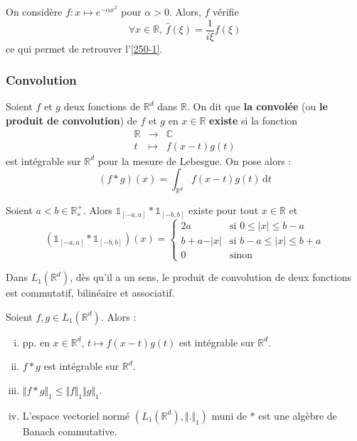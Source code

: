 	
	\begin{application}
		On considère $f : x \mapsto e^{- \alpha x^2}$ pour $\alpha > 0$. Alors, $f$ vérifie
		\[ \forall x \in \mathbb{R}, \, \widehat{f}(\xi) = \frac{1}{i \xi} f(\xi) \]
		ce qui permet de retrouver l'\cref{250-1}.
	\end{application}
	
	\subsubsection{Convolution}
	
	
	\begin{definition}
		Soient $f$ et $g$ deux fonctions de $\mathbb{R}^d$ dans $\mathbb{R}$. On dit que \textbf{la convolée} (ou \textbf{le produit de convolution}) de $f$ et $g$ en $x \in \mathbb{R}$ \textbf{existe} si la fonction
		\[
		\begin{array}{ccc}
			\mathbb{R} &\rightarrow& \mathbb{C} \\
			t &\mapsto& f(x-t)g(t)
		\end{array}
		\]
		est intégrable sur $\mathbb{R}^d$ pour la mesure de Lebesgue. On pose alors :
		\[ (f * g)(x) = \int_{\mathbb{R}^d} f(x-t)g(t) \, \mathrm{d}t \]
	\end{definition}
	
	\begin{example}
		Soient $a < b \in \mathbb{R}^+_*$. Alors $\mathbb{1}_{[-a, a]} * \mathbb{1}_{[-b,b]}$ existe pour tout $x \in \mathbb{R}$ et
		\[ \left( \mathbb{1}_{[-a, a]} * \mathbb{1}_{[-b,b]} \right)(x) =
		\begin{cases}
			2a &\text{si } 0 \leq \vert x \vert \leq b-a \\
			b+a-\vert x \vert &\text{si } b-a \leq \vert x \vert \leq b+a \\
			0 &\text{sinon}
		\end{cases}
		\]
	\end{example}
	
	\begin{proposition}
		Dans $L_1(\mathbb{R}^d)$, dès qu'il a un sens, le produit de convolution de deux fonctions est commutatif, bilinéaire et associatif.
	\end{proposition}
	
	\begin{theorem}
		Soient $f, g \in L_1(\mathbb{R}^d)$. Alors :
		\begin{enumerate}[(i)]
			\item pp. en $x \in \mathbb{R}^d$, $t \mapsto f(x-t)g(t)$ est intégrable sur $\mathbb{R}^d$.
			\item $f * g$ est intégrable sur $\mathbb{R}^d$.
			\item $\Vert f * g \Vert_1 \leq \Vert f \Vert_1 \Vert g \Vert_1$.
			\item L'espace vectoriel normé $(L_1(\mathbb{R}^d), \Vert . \Vert_1)$ muni de $*$ est une algèbre de Banach commutative.
		\end{enumerate}
	\end{theorem}
	

